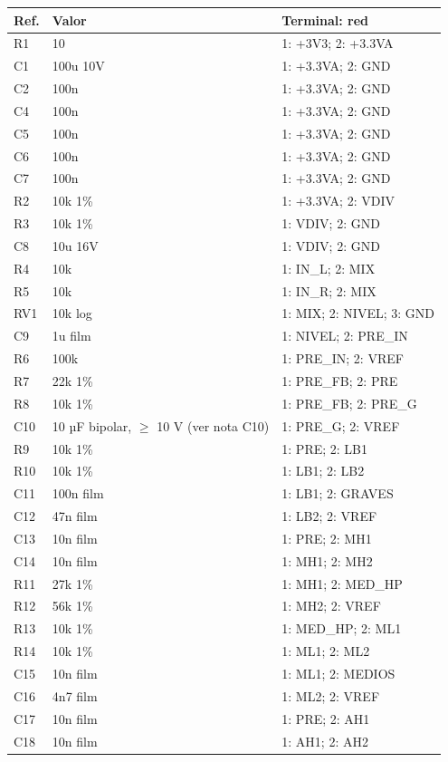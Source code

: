 \begin{longtable}{l p{44mm} p{96mm}}
\toprule Ref. & Valor & Terminal: red\\\midrule\endhead
R1 & 10 & 1: +3V3; 2: +3.3VA\\
C1 & 100u 10V & 1: +3.3VA; 2: GND\\
C2 & 100n & 1: +3.3VA; 2: GND\\
C4 & 100n & 1: +3.3VA; 2: GND\\
C5 & 100n & 1: +3.3VA; 2: GND\\
C6 & 100n & 1: +3.3VA; 2: GND\\
C7 & 100n & 1: +3.3VA; 2: GND\\
R2 & 10k 1\% & 1: +3.3VA; 2: VDIV\\
R3 & 10k 1\% & 1: VDIV; 2: GND\\
C8 & 10u 16V & 1: VDIV; 2: GND\\
R4 & 10k & 1: IN\_L; 2: MIX\\
R5 & 10k & 1: IN\_R; 2: MIX\\
RV1 & 10k log & 1: MIX; 2: NIVEL; 3: GND\\
C9 & 1u film & 1: NIVEL; 2: PRE\_IN\\
R6 & 100k & 1: PRE\_IN; 2: VREF\\
R7 & 22k 1\% & 1: PRE\_FB; 2: PRE\\
R8 & 10k 1\% & 1: PRE\_FB; 2: PRE\_G\\
C10 & 10 µF bipolar, \ensuremath{\geq} 10 V (ver nota C10) & 1: PRE\_G; 2: VREF\\
R9 & 10k 1\% & 1: PRE; 2: LB1\\
R10 & 10k 1\% & 1: LB1; 2: LB2\\
C11 & 100n film & 1: LB1; 2: GRAVES\\
C12 & 47n film & 1: LB2; 2: VREF\\
C13 & 10n film & 1: PRE; 2: MH1\\
C14 & 10n film & 1: MH1; 2: MH2\\
R11 & 27k 1\% & 1: MH1; 2: MED\_HP\\
R12 & 56k 1\% & 1: MH2; 2: VREF\\
R13 & 10k 1\% & 1: MED\_HP; 2: ML1\\
R14 & 10k 1\% & 1: ML1; 2: ML2\\
C15 & 10n film & 1: ML1; 2: MEDIOS\\
C16 & 4n7 film & 1: ML2; 2: VREF\\
C17 & 10n film & 1: PRE; 2: AH1\\
C18 & 10n film & 1: AH1; 2: AH2\\

\end{longtable}
